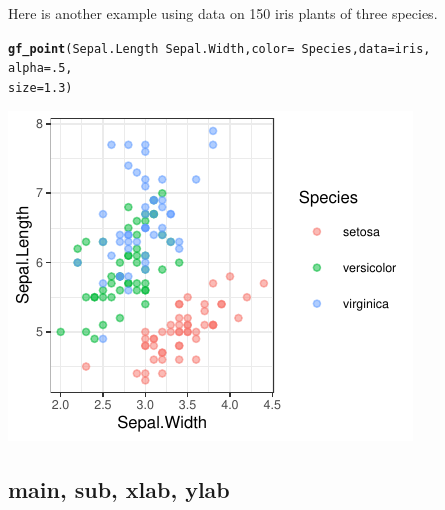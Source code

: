 \documentclass[twoside]{book}\usepackage[]{graphicx}\usepackage[]{xcolor}
\makeatletter
\def\maxwidth{ %
  \ifdim\Gin@nat@width>\linewidth
    \linewidth
  \else
    \Gin@nat@width
  \fi
}
\newcommand{\hlnum}[1]{\textcolor[rgb]{0.686,0.059,0.569}{#1}}%
\newcommand{\hlopt}[1]{\textcolor[rgb]{0,0,0}{#1}}%
\newcommand{\hlstd}[1]{\textcolor[rgb]{0.345,0.345,0.345}{#1}}%
\newcommand{\hlkwc}[1]{\textcolor[rgb]{0.333,0.667,0.333}{#1}}%
\newcommand{\hlkwd}[1]{\textcolor[rgb]{0.737,0.353,0.396}{\textbf{#1}}}%
\newenvironment{kframe}{%
 \def\at@end@of@kframe{}%
 \ifinner\ifhmode%
  \def\at@end@of@kframe{\end{minipage}}%
  \begin{minipage}{\columnwidth}%
 \fi\fi%
 \def\FrameCommand##1{\hskip\@totalleftmargin \hskip-\fboxsep
 \colorbox{shadecolor}{##1}\hskip-\fboxsep
     \hskip-\linewidth \hskip-\@totalleftmargin \hskip\columnwidth}%
 \MakeFramed {\advance\hsize-\width
   \@totalleftmargin\z@ \linewidth\hsize
   \@setminipage}}%
 {\par\unskip\endMakeFramed%
 \at@end@of@kframe}
\newenvironment{knitrout}{}{} %
\newcounter{example}[section]
\makeatother
\begin{document}
Here is another example using data on 150 iris plants of three species.
\begin{knitrout}
\color{fgcolor}\begin{kframe}
\begin{alltt}
\hlkwd{gf_point}\hlstd{(Sepal.Length} \hlopt{~} \hlstd{Sepal.Width,} \hlkwc{color} \hlstd{=} \hlopt{~} \hlstd{Species,} \hlkwc{data} \hlstd{= iris,}
        \hlkwc{alpha} \hlstd{=} \hlnum{.5}\hlstd{,}
        \hlkwc{size} \hlstd{=} \hlnum{1.3}\hlstd{)}
\end{alltt}
\end{kframe}

{\centering \includegraphics[width=\maxwidth]{figures/fig-iris-xyplot-alpha-1} 

}



\end{knitrout}

\subsection*{main, sub, xlab, ylab}
\end{document}
